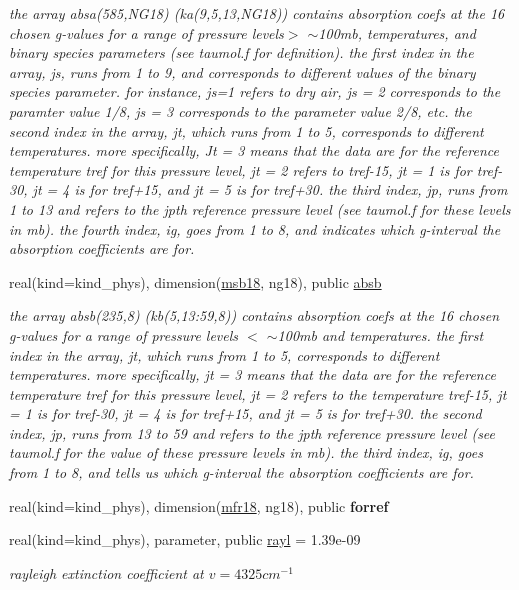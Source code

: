 \begin{Indent}
\begin{DoxyCompactItemize}
\begin{DoxyCompactList}\small\item\em the array absa(585,\+N\+G18) (ka(9,5,13,\+N\+G18)) contains absorption coefs at the 16 chosen g-\/values for a range of pressure levels$>$ $\sim$100mb, temperatures, and binary species parameters (see taumol.\+f for definition). the first index in the array, js, runs from 1 to 9, and corresponds to different values of the binary species parameter. for instance, js=1 refers to dry air, js = 2 corresponds to the paramter value 1/8, js = 3 corresponds to the parameter value 2/8, etc. the second index in the array, jt, which runs from 1 to 5, corresponds to different temperatures. more specifically, Jt = 3 means that the data are for the reference temperature tref for this pressure level, jt = 2 refers to tref-\/15, jt = 1 is for tref-\/30, jt = 4 is for tref+15, and jt = 5 is for tref+30. the third index, jp, runs from 1 to 13 and refers to the jpth reference pressure level (see taumol.\+f for these levels in mb). the fourth index, ig, goes from 1 to 8, and indicates which g-\/interval the absorption coefficients are for. \end{DoxyCompactList}\item 
real(kind=kind\+\_\+phys), dimension(\hyperlink{group__module__radsw__kgbnn_gad2e52d9beb90328236a351926d1a3432}{msb18}, ng18), public \hyperlink{group__module__radsw__kgbnn_ga858680db0ee5e9a599639844a91f8f06}{absb}
\begin{DoxyCompactList}\small\item\em the array absb(235,8) (kb(5,13\+:59,8)) contains absorption coefs at the 16 chosen g-\/values for a range of pressure levels $<$ $\sim$100mb and temperatures. the first index in the array, jt, which runs from 1 to 5, corresponds to different temperatures. more specifically, jt = 3 means that the data are for the reference temperature tref for this pressure level, jt = 2 refers to the temperature tref-\/15, jt = 1 is for tref-\/30, jt = 4 is for tref+15, and jt = 5 is for tref+30. the second index, jp, runs from 13 to 59 and refers to the jpth reference pressure level (see taumol.\+f for the value of these pressure levels in mb). the third index, ig, goes from 1 to 8, and tells us which g-\/interval the absorption coefficients are for. \end{DoxyCompactList}\item 
real(kind=kind\+\_\+phys), dimension(\hyperlink{group__module__radsw__kgbnn_ga9fa8140413e7ec769baea4f207e58393}{mfr18}, ng18), public {\bfseries forref}
\item 
real(kind=kind\+\_\+phys), parameter, public \hyperlink{group__module__radsw__kgbnn_ga9cd3f07e259e4982c7ef2889fee6cccb}{rayl} = 1.\+39e-\/09
\begin{DoxyCompactList}\small\item\em rayleigh extinction coefficient at $v=4325 cm^{-1}$ \end{DoxyCompactList}\end{DoxyCompactItemize}
\end{Indent}
